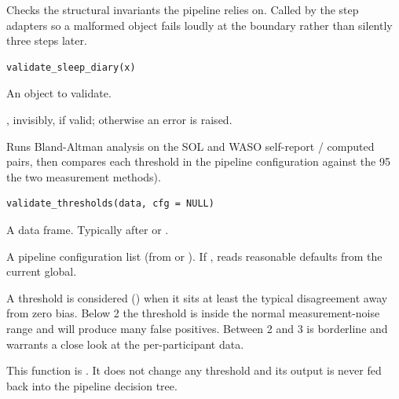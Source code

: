 \documentclass[a4paper]{book}
\begin{document}
%
\begin{Description}
Checks the structural invariants the pipeline relies on. Called by the step
adapters so a malformed object fails loudly at the boundary rather than
silently three steps later.
\end{Description}
%
\begin{Usage}
\begin{verbatim}
validate_sleep_diary(x)
\end{verbatim}
\end{Usage}
%
\begin{Arguments}
\begin{ldescription}
\item[\code{x}] An object to validate.
\end{ldescription}
\end{Arguments}
%
\begin{Value}
, invisibly, if valid; otherwise an error is raised.
\end{Value}
%
\begin{Description}
Runs Bland-Altman analysis on the SOL and WASO self-report / computed
pairs, then compares each threshold in the pipeline configuration against
the 95 
the two measurement methods).
\end{Description}
%
\begin{Usage}
\begin{verbatim}
validate_thresholds(data, cfg = NULL)
\end{verbatim}
\end{Usage}
%
\begin{Arguments}
\begin{ldescription}
\item[\code{data}] A data frame. Typically  after
 or .

\item[\code{cfg}] A pipeline configuration list (from  or
). If , reads reasonable defaults
from the current  global.
\end{ldescription}
\end{Arguments}
%
\begin{Details}
A threshold is considered  (\eqn{\checkmark}{}) when it sits
at least \strong{3\eqn{\times}{}} the typical disagreement away from zero bias.
Below 2\eqn{\times}{} the threshold is inside the normal measurement-noise range
and will produce many false positives. Between 2\eqn{\times}{} and 3\eqn{\times}{} is
borderline and warrants a close look at the per-participant data.

This function is . It does not change any threshold
and its output is never fed back into the pipeline decision tree.
\end{Details}
\end{document}
